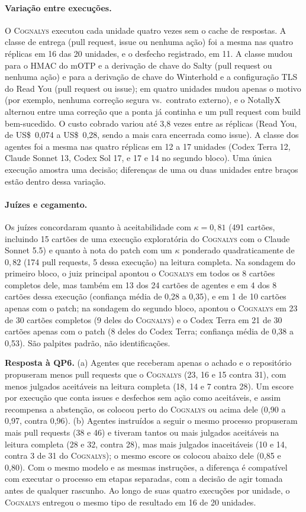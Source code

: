 \documentclass[conference]{IEEEtran}
\newcommand{\system}{\textsc{Cognalys}}
\newcommand{\researchq}[1]{\textbf{QP#1}}
\begin{document}
\paragraph{Variação entre execuções.} O \system{} executou cada unidade quatro vezes sem o
cache de respostas. A classe de entrega (pull request, issue ou nenhuma ação) foi a
mesma nas quatro réplicas em 16 das 20 unidades, e o desfecho registrado, em
11. A classe mudou para o HMAC do mOTP e a derivação de chave do Salty (pull request
ou nenhuma ação) e para a derivação de chave do Winterhold e a configuração TLS do Read You (pull
request ou issue); em quatro unidades mudou apenas o motivo (por exemplo, nenhuma correção segura vs.\
contrato externo), e o NotallyX alternou entre uma correção que a ponta já continha e um
pull request com build bem-sucedido. O custo cobrado variou até 3,8 vezes entre as réplicas
(Read You, de US\$~0,074 a US\$~0,28, sendo a mais cara encerrada como issue).
A classe dos agentes foi a mesma nas quatro réplicas em 12 a 17 unidades
(Codex Terra 12, Claude Sonnet 13, Codex Sol 17, e 17 e 14 no segundo
bloco). Uma única execução amostra uma
decisão; diferenças de uma ou duas unidades entre braços estão dentro dessa
variação.

\paragraph{Juízes e cegamento.} Os juízes concordaram quanto à aceitabilidade com
$\kappa = 0{,}81$ (491 cartões, incluindo 15 cartões de uma execução exploratória
do \system{} com o Claude Sonnet 5.5) e quanto à nota do patch com um $\kappa$
ponderado quadraticamente de $0{,}82$ (174 pull requests, 5 dessa execução) na
leitura completa. Na sondagem do primeiro bloco, o juiz principal apontou o
\system{} em todos os 8 cartões completos dele, mas também em 13 dos 24 cartões
de agentes e em 4 dos 8 cartões dessa execução (confiança média de 0,28 a
0,35), e em 1 de 10 cartões apenas com o patch; na sondagem do segundo bloco,
apontou o \system{} em 23 de 30 cartões completos (9 deles do \system{}) e o
Codex Terra em 21 de 30 cartões apenas com o patch (8 deles do Codex Terra;
confiança média de 0,38 a 0,53). São palpites padrão, não identificações.

\textbf{Resposta à \researchq{6}.} (a) Agentes que receberam apenas o achado e o
repositório propuseram menos pull requests que o \system{} (23, 16 e 15 contra 31),
com menos julgados aceitáveis na leitura completa (18, 14 e 7 contra 28). Um escore
por execução que conta issues e desfechos sem ação como aceitáveis, e assim recompensa
a abstenção, os colocou perto do \system{} ou acima dele (0,90 a 0,97, contra
0,96). (b) Agentes instruídos a seguir o mesmo processo propuseram mais pull
requests (38 e 46) e tiveram tantos ou mais julgados aceitáveis na leitura completa
(28 e 32, contra 28), mas mais julgados inaceitáveis (10 e 14, contra 3 de 31 do
\system{}); o mesmo escore os colocou abaixo dele (0,85 e 0,80). Com o mesmo modelo
e as mesmas instruções, a diferença é compatível com executar o processo em
etapas separadas, com a decisão de agir tomada antes de qualquer rascunho. Ao
longo de suas quatro execuções por unidade, o \system{} entregou o mesmo tipo de
resultado em 16 de 20 unidades.
\end{document}
